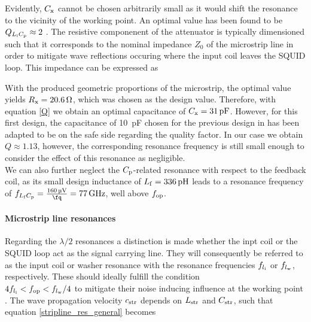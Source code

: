 
Evidently, $C_{\rm x}$ cannot be chosen arbitrarily small as it would shift the resonance to the vicinity of the working point. An optimal value has been found to be $Q_{L_{\rm i}C_{\rm p}}\approx 2$ \cite{Cantor1996}. The resistive componenent of the attenuator is typically dimensioned such that it corresponds to the nominal impedance $Z_0$ of the microstrip line in order to mitigate wave reflections occuring where the input coil leaves the SQUID loop. This impedance can be expressed as \cite{EnpukuI1991} 


With the produced geometric proportions of the microstrip, the optimal value yields $R_{\rm x}=\qty{20.6}{\ohm}$, which was chosen as the design value. Therefore, with equation \ref{Q} we obtain an optimal capacitance of $C_{\rm x}=\qty{31}{\pF}$. 
However, for this first design, the capacitance of \qty{10}{\pF} chosen for the previous design  in \cite{Bauer2022} has been adapted to be on the safe side regarding the quality factor.
In our case we obtain $Q\approx 1.13$, however, the corresponding resonance frequency is still small enough to consider the effect of this resonance as negligible. \\
We can also further neglect the $C_{\rm p}$-related resonance with respect to the feedback coil, as its small design inductance of $L_{\rm f}=\qty{336}{\pH}$ leads to a resonance frequency of $f_{L_{\rm f}C_{\rm p}}=\frac{\qty{160}{\uV}}{\unit{\fq}}=\qty{77}{\GHz}$, well above $f_{\rm op}$. 

\paragraph{Microstrip line resonances}

Regarding the $\lambda/2$ resonances a distinction is made whether the inpt coil or the SQUID loop act as the signal carrying line. They will consequently be referred to as the input coil or washer resonance with the resonance frequencies $f_{l_{\rm i}}$ or $f_{l_{\rm w}}$, respectively. These should ideally fulfill the condition \\ $4f_{l_{\rm i}}<f_{\rm op}<f_{l_{\rm w}}/4$ to mitigate their noise inducing influence at the working point \cite{Can1991}. The wave propagation velocity $c_{\rm str}$ depends on $L_{\rm str}$ and $C_{\rm str}$, such that equation \ref{stripline_res_general} becomes \cite{EnpukuIII1992}        

